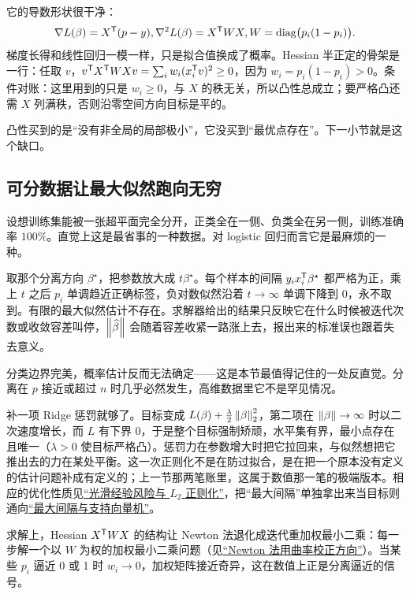 它的导数形状很干净：
\[
\nabla L(\beta)=X^{\mathsf{T}}(p-y),\space
\nabla^2L(\beta)=X^{\mathsf{T}}WX,\space W=\operatorname{diag}\bigl(p_i(1-p_i)\bigr).
\]
梯度长得和线性回归一模一样，只是拟合值换成了概率。Hessian 半正定的骨架是一行：任取 \(v\)，\(v^{\mathsf{T}}X^{\mathsf{T}}WXv=\sum_i w_i(x_i^{\mathsf{T}}v)^2\ge 0\)，因为 \(w_i=p_i(1-p_i)>0\)。条件对账：这里用到的只是 \(w_i\ge 0\)，与 \(X\) 的秩无关，所以凸性总成立；要严格凸还需 \(X\) 列满秩，否则沿零空间方向目标是平的。

凸性买到的是``没有非全局的局部极小''，它没买到``最优点存在''。下一小节就是这个缺口。

\subsection{可分数据让最大似然跑向无穷}

设想训练集能被一张超平面完全分开，正类全在一侧、负类全在另一侧，训练准确率 \(100\%\)。直觉上这是最省事的一种数据。对 logistic 回归而言它是最麻烦的一种。

取那个分离方向 \(\beta^{\star}\)，把参数放大成 \(t\beta^{\star}\)。每个样本的间隔 \(y_ix_i^{\mathsf{T}}\beta^{\star}\) 都严格为正，乘上 \(t\) 之后 \(p_i\) 单调趋近正确标签，负对数似然沿着 \(t\to\infty\) 单调下降到 0，永不取到。有限的最大似然估计不存在。求解器给出的结果只反映它在什么时候被迭代次数或收敛容差叫停，\(\left\lVert\widehat\beta\right\rVert\) 会随着容差收紧一路涨上去，报出来的标准误也跟着失去意义。

分类边界完美，概率估计反而无法确定——这是本节最值得记住的一处反直觉。分离在 \(p\) 接近或超过 \(n\) 时几乎必然发生，高维数据里它不是罕见情况。

补一项 Ridge 惩罚就够了。目标变成 \(L(\beta)+\tfrac{\lambda}{2}\left\lVert\beta\right\rVert_2^2\)，第二项在 \(\left\lVert\beta\right\rVert\to\infty\) 时以二次速度增长，而 \(L\) 有下界 0，于是整个目标强制矫顽，水平集有界，最小点存在且唯一（\(\lambda>0\) 使目标严格凸）。惩罚力在参数增大时把它拉回来，与似然想把它推出去的力在某处平衡。这一次正则化不是在防过拟合，是在把一个原本没有定义的估计问题补成有定义的；上一节那两笔账里，这属于数值那一笔的极端版本。相应的优化性质见\hyperref[sec:09-Convex-Optimization/07-Applications/01]{``光滑经验风险与 \(L_2\) 正则化''}，把``最大间隔''单独拿出来当目标则通向\hyperref[sec:09-Convex-Optimization/07-Applications/03]{``最大间隔与支持向量机''}。

求解上，Hessian \(X^{\mathsf{T}}WX\) 的结构让 Newton 法退化成迭代重加权最小二乘：每一步解一个以 \(W\) 为权的加权最小二乘问题（见\hyperref[sec:09-Convex-Optimization/06-Optimization-Algorithms/02]{``Newton 法用曲率校正方向''}）。当某些 \(p_i\) 逼近 0 或 1 时 \(w_i\to 0\)，加权矩阵接近奇异，这在数值上正是分离逼近的信号。

